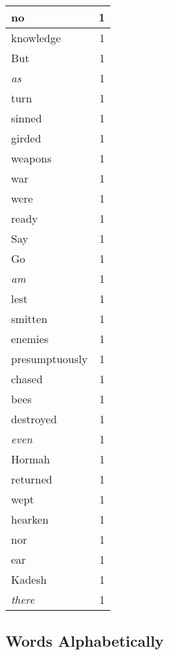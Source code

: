 \begin{center}
\begin{longtable}{l|r}
no & 1 \\ \hline
knowledge & 1 \\ \hline
But & 1 \\ \hline
\emph{as} & 1 \\ \hline
turn & 1 \\ \hline
sinned & 1 \\ \hline
girded & 1 \\ \hline
weapons & 1 \\ \hline
war & 1 \\ \hline
were & 1 \\ \hline
ready & 1 \\ \hline
Say & 1 \\ \hline
Go & 1 \\ \hline
\emph{am} & 1 \\ \hline
lest & 1 \\ \hline
smitten & 1 \\ \hline
enemies & 1 \\ \hline
presumptuously & 1 \\ \hline
chased & 1 \\ \hline
bees & 1 \\ \hline
destroyed & 1 \\ \hline
\emph{even} & 1 \\ \hline
Hormah & 1 \\ \hline
returned & 1 \\ \hline
wept & 1 \\ \hline
hearken & 1 \\ \hline
nor & 1 \\ \hline
ear & 1 \\ \hline
Kadesh & 1 \\ \hline
\emph{there} & 1 \\ \hline
\end{longtable}
\end{center}



\normalsize



\subsection{Words Alphabetically}

